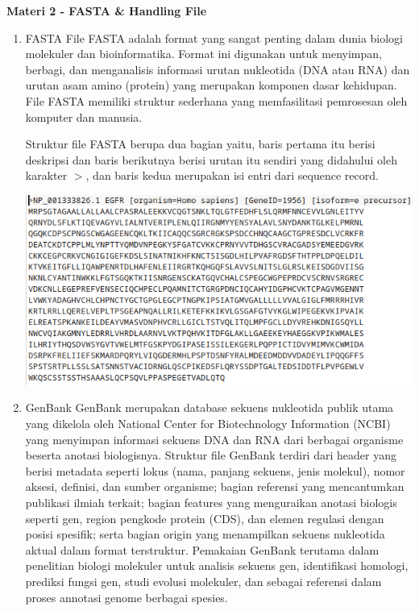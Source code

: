\documentclass{article}
\begin{document}
    \begin{flushleft}
        \textbf{Materi 2 -  FASTA \& Handling File}
        \newline

        \begin{enumerate}
            \setlength\itemsep{2em}

            \item FASTA
            File FASTA adalah format yang sangat penting dalam dunia biologi molekuler
            dan bioinformatika. Format ini digunakan untuk menyimpan, berbagi, dan
            menganalisis informasi urutan nukleotida (DNA atau RNA) dan urutan asam
            amino (protein) yang merupakan komponen dasar kehidupan. File FASTA
            memiliki struktur sederhana yang memfasilitasi pemrosesan oleh komputer dan
            manusia.

            Struktur file FASTA berupa dua bagian yaitu, baris pertama itu berisi deskripsi dan baris berikutnya berisi urutan itu sendiri yang didahului oleh karakter $>$, dan baris kedua merupakan isi entri dari sequence record.
            \par\vspace{0.5cm}
            \includegraphics[scale=0.6]{Modul1/img/17.png}

            \item GenBank
            GenBank merupakan database sekuens nukleotida publik utama yang dikelola oleh National Center for Biotechnology Information (NCBI) yang menyimpan informasi sekuens DNA dan RNA dari berbagai organisme beserta anotasi biologisnya. Struktur file GenBank terdiri dari header yang berisi metadata seperti lokus (nama, panjang sekuens, jenis molekul), nomor aksesi, definisi, dan sumber organisme; bagian referensi yang mencantumkan publikasi ilmiah terkait; bagian features yang menguraikan anotasi biologis seperti gen, region pengkode protein (CDS), dan elemen regulasi dengan posisi spesifik; serta bagian origin yang menampilkan sekuens nukleotida aktual dalam format terstruktur. Pemakaian GenBank terutama dalam penelitian biologi molekuler untuk analisis sekuens gen, identifikasi homologi, prediksi fungsi gen, studi evolusi molekuler, dan sebagai referensi dalam proses annotasi genome berbagai spesies.


\end{enumerate}
\end{flushleft}
\end{document}
